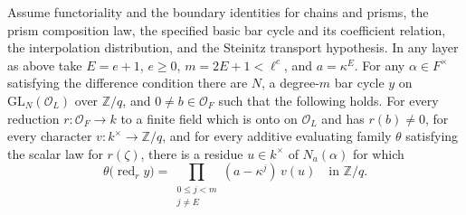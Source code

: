 
\begin{formalstatement}\label{pn:P032}
Assume functoriality and the boundary identities for chains and prisms,
the prism composition law, the specified basic bar cycle and its
coefficient relation, the interpolation distribution, and the Steinitz
transport hypothesis. In any layer as above take \(E=e+1\), \(e\ge0\),
\(m=2E+1<\ell^c\), and \(a=\kappa^E\). For any \(\alpha\in F^\times\)
satisfying the difference condition there are \(N\), a degree-\(m\)
bar cycle \(y\) on \(\mathrm{GL}_N(\mathcal O_L)\) over
\(\mathbb Z/q\), and \(0\ne b\in\mathcal O_F\) such that the following
holds. For every reduction \(r:\mathcal O_F\to k\) to a finite field
which is onto on \(\mathcal O_L\) and has \(r(b)\ne0\), for every
character \(v:k^\times\to\mathbb Z/q\), and for every additive
evaluating family \(\theta\) satisfying the scalar law for \(r(\zeta)\),
there is a residue \(u\in k^\times\) of \(N_a(\alpha)\) for which
\[
 \theta\bigl(\operatorname{red}_r y\bigr)=
 \prod_{\substack{0\le j<m\\j\ne E}}(a-\kappa^j)\,v(u)
 \quad\text{in }\mathbb Z/q.
\]
\end{formalstatement}
